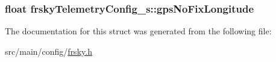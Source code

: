 \hypertarget{structfrskyTelemetryConfig__s_a81ca94cf69b47f0a2682b9f993f05adb}{
\subsubsection[{gps\+No\+Fix\+Longitude}]{\setlength{\rightskip}{0pt plus 5cm}float frsky\+Telemetry\+Config\+\_\+s\+::gps\+No\+Fix\+Longitude}}\label{structfrskyTelemetryConfig__s_a81ca94cf69b47f0a2682b9f993f05adb}


The documentation for this struct was generated from the following file\+:\begin{DoxyCompactItemize}
\item 
src/main/config/\hyperlink{config_2frsky_8h}{frsky.\+h}\end{DoxyCompactItemize}
